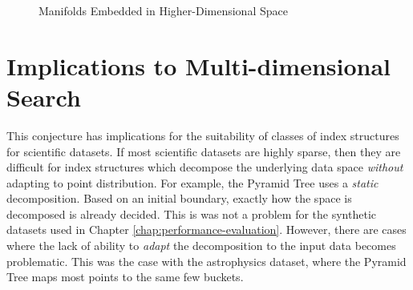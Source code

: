 \begin{figure}
	\caption{Manifolds Embedded in Higher-Dimensional Space}
	\label{fig:manifolds}
\end{figure}

\section{Implications to Multi-dimensional Search}
\label{sec:implications-to-md-search}

This conjecture has implications for the suitability of classes of index structures for scientific datasets. If most scientific datasets are highly sparse, then they are difficult for index structures which decompose the underlying data space \textit{without} adapting to point distribution. For example, the Pyramid Tree uses a \textit{static} decomposition. Based on an initial boundary, exactly how the space is decomposed is already decided. This is was not a problem for the synthetic datasets used in Chapter \ref{chap:performance-evaluation}. However, there are cases where the lack of ability to \textit{adapt} the decomposition to the input data becomes problematic. This was the case with the astrophysics dataset, where the Pyramid Tree maps most points to the same few buckets.

